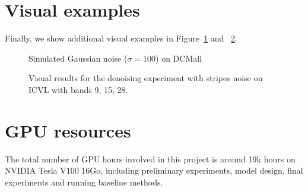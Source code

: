 \begin{table}[H]
	\centering
	\label{table:beta}
\end{table}



\section{Visual examples}

Finally, we show additional visual examples  in Figure~\ref{fig:1} and ~\ref{fig:2}.

\begin{figure}[H]
	
	\caption{Simulated Gaussian noise ($\sigma=100$) on DCMall}\label{fig:1}
\end{figure}

\begin{figure}[H]
	
	\caption{Visual results for the denoising experiment with stripes noise on ICVL with bands 9, 15, 28.}\label{fig:2}
\end{figure}


\section{GPU resources}

The total number of GPU hours involved in this project is around 19k hours on NVIDIA Tesla V100 16Go, including preliminary experiments, model design, final experiments and running baseline methods.